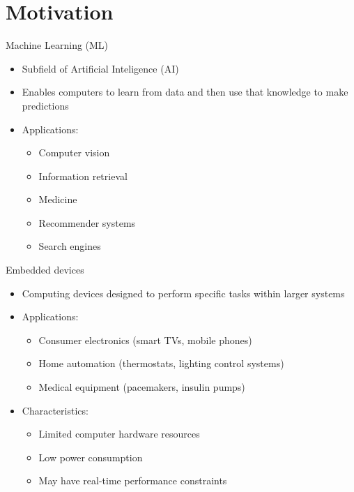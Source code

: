 
\section{Motivation}

\begin{frame}{Machine Learning (ML)}
\begin{itemize}
  \item Subfield of Artificial Inteligence (AI)
  \item Enables computers to learn from data and then use that knowledge to
  make predictions
  \item Applications:
	\begin{itemize}
	  \item Computer vision
	  \item Information retrieval
	  \item Medicine
	  \item Recommender systems
	  \item Search engines
	\end{itemize}
\end{itemize}
\end{frame}

\begin{frame}{Embedded devices}
\begin{itemize}
  \item Computing devices designed to perform specific tasks within larger systems
 \item Applications:
	\begin{itemize}
	  \item Consumer electronics (smart TVs, mobile phones)
	  \item Home automation (thermostats, lighting control systems)
	  \item Medical equipment (pacemakers, insulin pumps)
	\end{itemize}
  \item Characteristics:
	\begin{itemize}
	  \item Limited computer hardware resources
	  \item Low power consumption
	  \item May have real-time performance constraints
	\end{itemize}
\end{itemize}
\end{frame}

